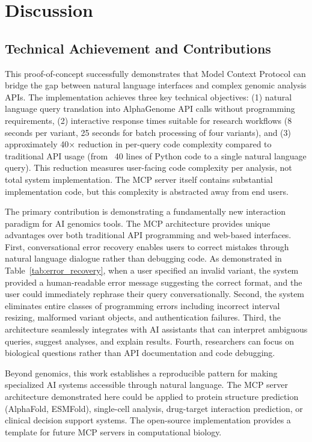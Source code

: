 \documentclass[11pt]{article}
\begin{document}
\section{Discussion}

\subsection*{Technical Achievement and Contributions}

This proof-of-concept successfully demonstrates that Model Context Protocol can bridge the gap between natural language interfaces and complex genomic analysis APIs. The implementation achieves three key technical objectives: (1) natural language query translation into AlphaGenome API calls without programming requirements, (2) interactive response times suitable for research workflows (8 seconds per variant, 25 seconds for batch processing of four variants), and (3) approximately 40× reduction in per-query code complexity compared to traditional API usage (from ~40 lines of Python code to a single natural language query). This reduction measures user-facing code complexity per analysis, not total system implementation. The MCP server itself contains substantial implementation code, but this complexity is abstracted away from end users.

The primary contribution is demonstrating a fundamentally new interaction paradigm for AI genomics tools. The MCP architecture provides unique advantages over both traditional API programming and web-based interfaces. First, conversational error recovery enables users to correct mistakes through natural language dialogue rather than debugging code. As demonstrated in Table~\ref{tab:error_recovery}, when a user specified an invalid variant, the system provided a human-readable error message suggesting the correct format, and the user could immediately rephrase their query conversationally. Second, the system eliminates entire classes of programming errors including incorrect interval resizing, malformed variant objects, and authentication failures. Third, the architecture seamlessly integrates with AI assistants that can interpret ambiguous queries, suggest analyses, and explain results. Fourth, researchers can focus on biological questions rather than API documentation and code debugging.

Beyond genomics, this work establishes a reproducible pattern for making specialized AI systems accessible through natural language. The MCP server architecture demonstrated here could be applied to protein structure prediction (AlphaFold, ESMFold), single-cell analysis, drug-target interaction prediction, or clinical decision support systems. The open-source implementation provides a template for future MCP servers in computational biology.
\end{document}
